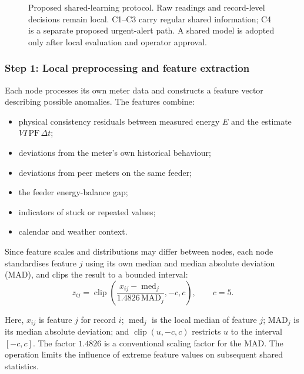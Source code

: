 \begin{figure}[H]
{%
}
\caption{Proposed shared-learning protocol. Raw readings and
record-level decisions remain local. C1--C3 carry regular shared
information; C4 is a separate proposed urgent-alert path. A shared
model is adopted only after local evaluation and operator approval.}
\label{g4-fig:protocol-pipeline}
\end{figure}

\subsubsection{Step 1: Local preprocessing and feature extraction}

Each node processes its own meter data and constructs a feature vector
describing possible anomalies. The features combine:
\begin{itemize}
    \item physical consistency residuals between measured energy
    $E$ and the estimate $VI\,\mathrm{PF}\,\Delta t$;
    \item deviations from the meter's own historical behaviour;
    \item deviations from peer meters on the same feeder;
    \item the feeder energy-balance gap;
    \item indicators of stuck or repeated values;
    \item calendar and weather context.
\end{itemize}

Since feature scales and distributions may differ between nodes, each
node standardises feature $j$ using its own median and median absolute
deviation (MAD), and clips the result to a bounded interval:
\begin{equation}
z_{ij} =
\operatorname{clip}\!\left(
\frac{x_{ij}-\operatorname{med}_j}
     {1.4826\,\mathrm{MAD}_j},
-c,c
\right),
\qquad c=5.
\label{g4-eq:protocol-preprocessing}
\end{equation}

Here, $x_{ij}$ is feature $j$ for record $i$;
$\operatorname{med}_j$ is the local median of feature $j$;
$\mathrm{MAD}_j$ is its median absolute deviation; and
$\operatorname{clip}(u,-c,c)$ restricts $u$ to the interval
$[-c,c]$. The factor $1.4826$ is a conventional scaling factor for
the MAD. The operation limits the influence of extreme feature values
on subsequent shared statistics.

